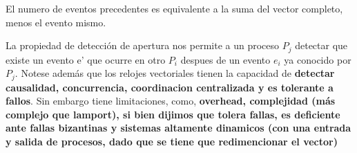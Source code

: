 El  numero de eventos precedentes es equivalente a la suma del vector completo, menos el evento mismo.

La propiedad de detección de apertura nos permite a un proceso $P_j$ detectar que existe un evento e' que ocurre en otro $P_i$ despues de un evento $e_i$ ya conocido por $P_j$. Notese además que los relojes vectoriales tienen la capacidad de \textbf{detectar causalidad, concurrencia, coordinacion centralizada y es tolerante a fallos}. Sin embargo tiene limitaciones, como, \textbf{overhead, complejidad (más complejo que lamport), si bien dijimos que tolera fallas, es deficiente ante fallas bizantinas y sistemas altamente dinamicos (con una entrada y salida de procesos, dado que se tiene que redimencionar el vector)}



